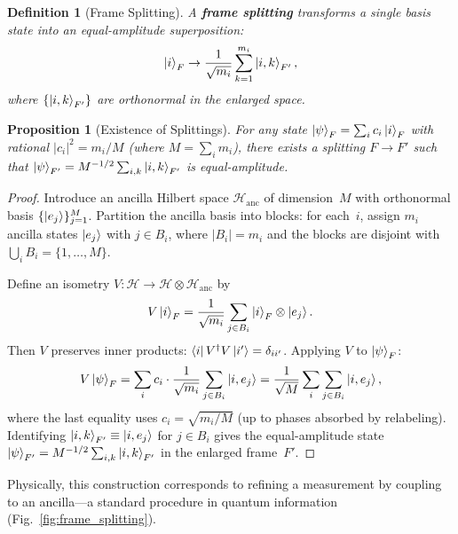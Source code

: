 \documentclass[aps,prd,twocolumn,superscriptaddress,nofootinbib,floatfix]{revtex4-2}
\newtheorem{definition}{Definition}
\newtheorem{proposition}{Proposition}
\begin{document}
\begin{definition}[Frame Splitting]
A \textbf{frame splitting} transforms a single basis state into an equal-amplitude superposition:
\begin{equation}\label{eq:splitting}
\ket{i}_F \to \frac{1}{\sqrt{m_i}} \sum_{k=1}^{m_i} \ket{i,k}_{F'},
\end{equation}
where $\{\ket{i,k}_{F'}\}$ are orthonormal in the enlarged space.
\end{definition}

\begin{proposition}[Existence of Splittings]\label{prop:splitting}
For any state $\ket{\psi}_F = \sum_i c_i\ket{i}_F$ with rational $|c_i|^2 = m_i/M$ (where $M = \sum_i m_i$), there exists a splitting $F \to F'$ such that $\ket{\psi}_{F'} = M^{-1/2}\sum_{i,k}\ket{i,k}_{F'}$ is equal-amplitude.
\end{proposition}

\begin{proof}
Introduce an ancilla Hilbert space $\mathcal{H}_{\mathrm{anc}}$ of dimension~$M$ with orthonormal basis $\{\ket{e_j}\}_{j=1}^M$. Partition the ancilla basis into blocks: for each~$i$, assign $m_i$ ancilla states $\ket{e_{j}}$ with $j \in B_i$, where $|B_i| = m_i$ and the blocks are disjoint with $\bigcup_i B_i = \{1,\ldots,M\}$.

Define an isometry $V: \mathcal{H} \to \mathcal{H} \otimes \mathcal{H}_{\mathrm{anc}}$ by
\begin{equation}\label{eq:isometry}
V\ket{i}_F = \frac{1}{\sqrt{m_i}} \sum_{j \in B_i} \ket{i}_F \otimes \ket{e_j}.
\end{equation}
Then $V$ preserves inner products: $\bra{i}V^\dagger V\ket{i'} = \delta_{ii'}$. Applying $V$ to $\ket{\psi}_F$:
\begin{equation}
V\ket{\psi}_F = \sum_i c_i \cdot \frac{1}{\sqrt{m_i}} \sum_{j \in B_i} \ket{i,e_j} = \frac{1}{\sqrt{M}} \sum_{i}\sum_{j \in B_i} \ket{i,e_j},
\end{equation}
where the last equality uses $c_i = \sqrt{m_i/M}$ (up to phases absorbed by relabeling). Identifying $\ket{i,k}_{F'} \equiv \ket{i,e_j}$ for $j \in B_i$ gives the equal-amplitude state $\ket{\psi}_{F'} = M^{-1/2}\sum_{i,k}\ket{i,k}_{F'}$ in the enlarged frame~$F'$.
\end{proof}

Physically, this construction corresponds to refining a measurement by coupling to an ancilla---a standard procedure in quantum information (Fig.~\ref{fig:frame_splitting}).
\end{document}
